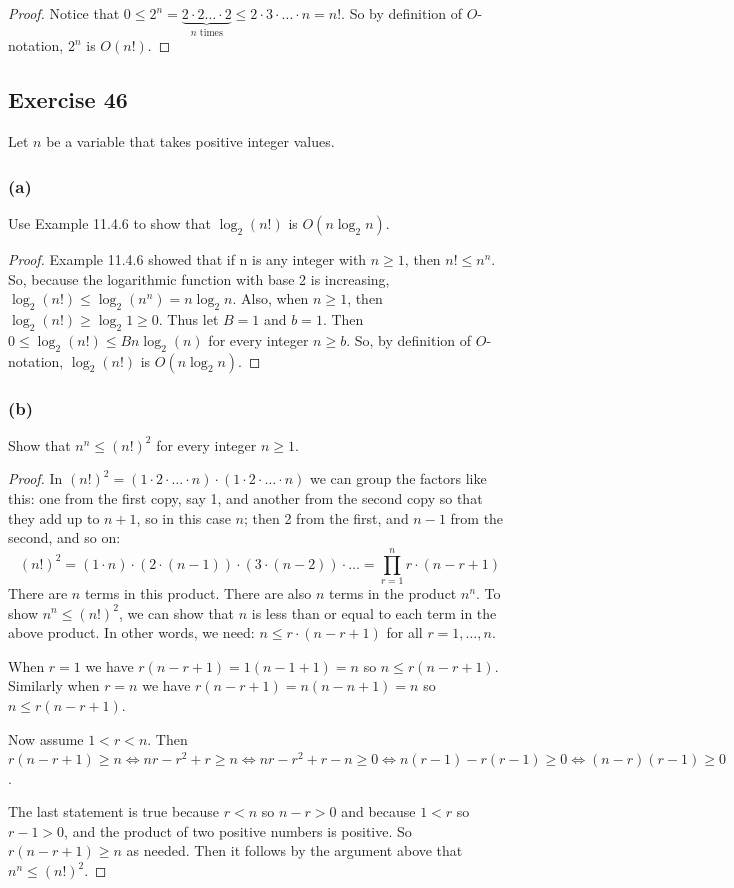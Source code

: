 \documentclass[14pt]{extarticle}
\begin{document}
\begin{proof}
    Notice that \(0 \leq 2^n = \underbrace{2 \cdot 2 \ldots \cdot 2}_{n \text{ times}} \leq 2\cdot 3\cdot \ldots \cdot n = n!\).
    So by definition of \(O\)-notation, \(2^n\) is \(O(n!)\).
\end{proof}

\subsection{Exercise 46}
Let \(n\) be a variable that takes positive integer values.

\subsubsection{(a)}
Use Example 11.4.6 to show that \(\log_2(n!)\) is \(O(n\log_2 n)\).

\begin{proof}
    Example 11.4.6 showed that if n is any integer with \(n \geq 1\), then \(n! \leq n^n\). So, because the logarithmic
    function with base 2 is increasing, \(\log_2(n!) \leq \log_2(n^n) = n \log_2 n\). Also, when \(n \geq 1\), then
    \(\log_2(n!) \geq \log_2 1 \geq 0\). Thus let \(B = 1\) and \(b = 1\). Then \(0 \leq \log_2(n!) \leq B n \log_2 (n)\) for
    every integer \(n \geq b\). So, by definition of \(O\)-notation, \(\log_2(n!)\) is \(O(n \log_2 n)\).
\end{proof}

\subsubsection{(b)}
Show that \(n^n \leq (n!)^2\) for every integer \(n \geq 1\).
\begin{proof}
    In \((n!)^2 = (1 \cdot 2 \cdot \ldots \cdot n) \cdot (1 \cdot 2 \cdot \ldots \cdot n)\) we can group the factors like this:
    one from the first copy, say 1, and another from the second copy so that they add up to \(n+1\), so in this case \(n\);
    then 2 from the first, and \(n-1\) from the second, and so on:
    \[
        (n!)^2 = (1 \cdot n) \cdot (2 \cdot (n-1)) \cdot (3 \cdot (n-2)) \cdot \ldots = \prod_{r = 1}^n r \cdot (n-r+1)
    \]
    There are \(n\) terms in this product. There are also \(n\) terms in the product \(n^n\). To show \(n^n \leq (n!)^2\), we
    can show that \(n\) is less than or equal to each term in the above product. In other words, we need: \(n \leq r \cdot
    (n-r+1)\) for all \(r = 1, \ldots, n\).

    When \(r = 1\) we have \(r(n-r+1) = 1(n-1+1) = n\) so \(n \leq r(n-r+1)\). Similarly when \(r=n\) we have
    \(r(n-r+1) = n(n-n+1) = n\) so \(n \leq r(n-r+1)\).

    Now assume \(1 < r < n\). Then \(r(n-r+1) \geq n \iff nr - r^2 + r \geq n \iff nr - r^2 + r - n \geq 0 \iff n(r-1) -r(r-1)
    \geq 0 \iff (n-r)(r-1) \geq 0\).

    The last statement is true because \(r < n\) so \(n - r > 0\) and because \(1 < r\) so \(r - 1 > 0\), and the product of two
    positive numbers is positive. So \(r(n-r+1) \geq n\) as needed. Then it follows by the argument above that
    \(n^n \leq (n!)^2\).
\end{proof}
\end{document}
